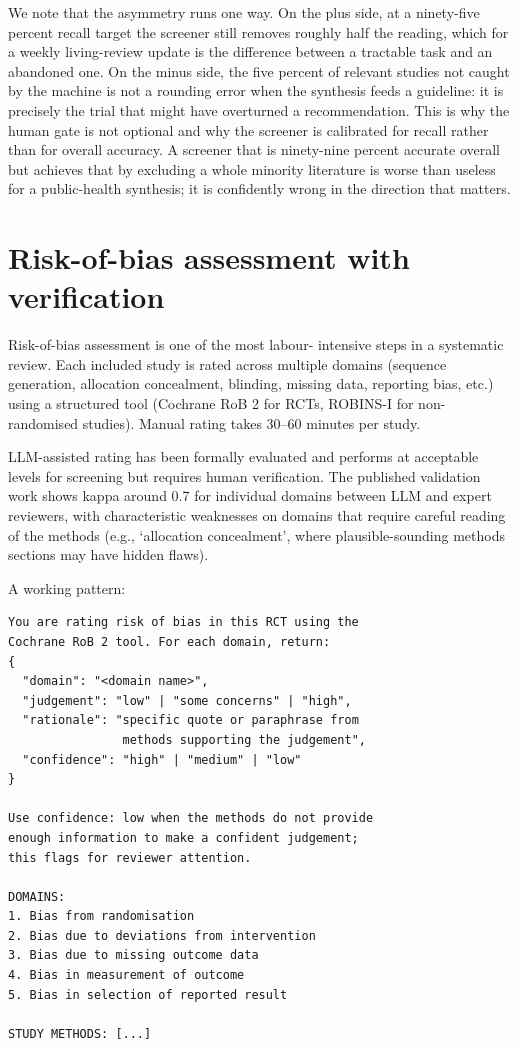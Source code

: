 \documentclass[
  letterpaper,
  11pt]{scrbook}
\begin{document}
We note that the asymmetry runs one way. On the plus side, at a
ninety-five percent recall target the screener still removes roughly
half the reading, which for a weekly living-review update is the
difference between a tractable task and an abandoned one. On the minus
side, the five percent of relevant studies not caught by the machine is
not a rounding error when the synthesis feeds a guideline: it is
precisely the trial that might have overturned a recommendation. This is
why the human gate is not optional and why the screener is calibrated
for recall rather than for overall accuracy. A screener that is
ninety-nine percent accurate overall but achieves that by excluding a
whole minority literature is worse than useless for a public-health
synthesis; it is confidently wrong in the direction that matters.

\section{Risk-of-bias assessment with
verification}\label{risk-of-bias-assessment-with-verification}

Risk-of-bias assessment is one of the most labour- intensive steps in a
systematic review. Each included study is rated across multiple domains
(sequence generation, allocation concealment, blinding, missing data,
reporting bias, etc.) using a structured tool (Cochrane RoB 2 for RCTs,
ROBINS-I for non-randomised studies). Manual rating takes 30--60 minutes
per study.

LLM-assisted rating has been formally evaluated and performs at
acceptable levels for screening but requires human verification. The
published validation work shows kappa around 0.7 for individual domains
between LLM and expert reviewers, with characteristic weaknesses on
domains that require careful reading of the methods (e.g., `allocation
concealment', where plausible-sounding methods sections may have hidden
flaws).

A working pattern:

\begin{verbatim}
You are rating risk of bias in this RCT using the
Cochrane RoB 2 tool. For each domain, return:
{
  "domain": "<domain name>",
  "judgement": "low" | "some concerns" | "high",
  "rationale": "specific quote or paraphrase from
                methods supporting the judgement",
  "confidence": "high" | "medium" | "low"
}

Use confidence: low when the methods do not provide
enough information to make a confident judgement;
this flags for reviewer attention.

DOMAINS:
1. Bias from randomisation
2. Bias due to deviations from intervention
3. Bias due to missing outcome data
4. Bias in measurement of outcome
5. Bias in selection of reported result

STUDY METHODS: [...]
\end{verbatim}
\end{document}
